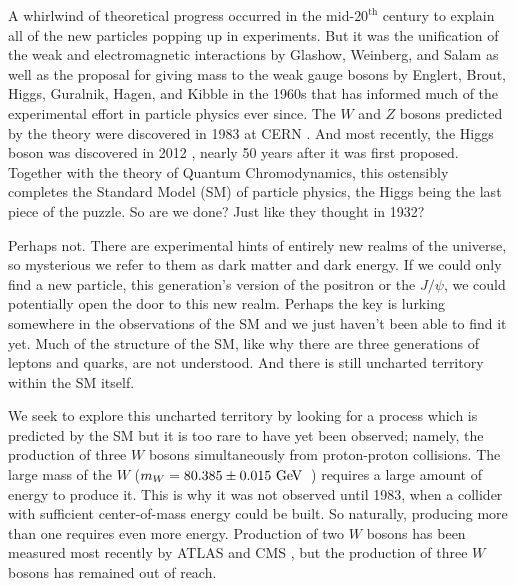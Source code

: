 

A whirlwind of theoretical progress occurred in the mid-$20^{\textrm{th}}$ century
to explain all of the new particles popping up in experiments. 
But it was the unification of the weak and electromagnetic interactions
by Glashow, Weinberg, and Salam \cite{glashow:1961tr,Salam:1968rm,weinberg:1967tq}
as well as the proposal for giving
mass to the weak gauge bosons by Englert, Brout, Higgs, Guralnik, Hagen,
and Kibble 
\cite{PhysRevLett.13.321,PhysRevLett.13.508,PhysRevLett.13.585}
in the 1960s that has informed much of the 
experimental effort in particle
physics ever since. The $W$ and $Z$ bosons predicted by the theory were 
discovered in 
1983 at CERN \cite{ARNISON1983103,ua1zobs}. 
And most recently, the Higgs boson was 
discovered in 2012 \cite{Aad20121,Chatrchyan:2012xdj},
nearly 50 years after it was first proposed. Together with the 
theory of Quantum Chromodynamics, this ostensibly completes the Standard 
Model (SM) of particle physics, the Higgs being the last piece of the 
puzzle.
So are we done? Just like they thought in 1932?


Perhaps not. There are experimental hints of entirely new realms of the universe, 
so mysterious we refer to them as dark matter and dark energy. 
If we could only find a new particle, this generation's version of the positron
or the $J/\psi$, we could potentially open the door to this new realm.
Perhaps the key is lurking somewhere in the observations of the SM and we 
just haven't been 
able to find it yet.  Much of the structure
of the SM, like why there are three generations of 
leptons and quarks, are not understood.
And there is still uncharted territory within the SM itself.

We seek to explore this uncharted territory by looking for a 
process which is predicted
by the SM but it is too rare to have yet been observed;  namely, the 
production of 
three $W$ bosons simultaneously from proton-proton collisions. The 
large mass of the 
$W$ ($m_W = 80.385 \pm 0.015\GeV$~\cite{PDG:2014}) requires a large amount 
of energy 
to produce it. This is why it was not observed until 1983, when a 
collider with sufficient center-of-mass 
energy could be built. So naturally, producing more than one requires
even more energy. Production of two $W$ bosons has been measured most recently 
by ATLAS \cite{Aad:2016wpd} and CMS \cite{Chatrchyan:2013oev}, but 
the production of three $W$ bosons has remained out of reach. 


